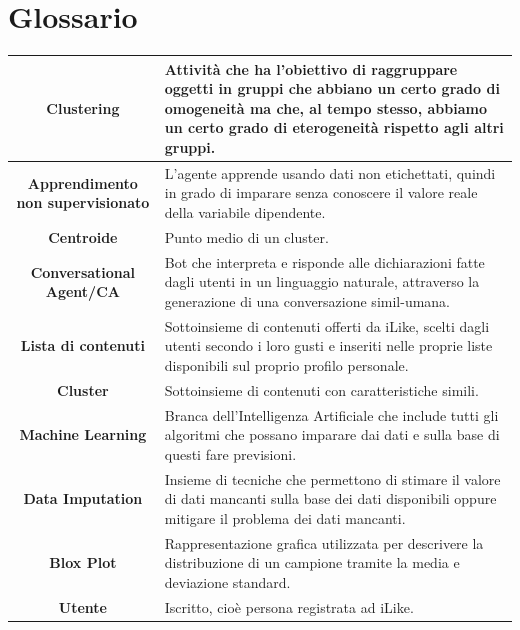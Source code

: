 \documentclass[a4paper, 10pt]{report}
\begin{document}
    \chapter{Glossario}\label{ch:glossario}
        \begin{adjustbox}{width=\columnwidth,center}
            \begin{tabular}{|>{\columncolor{Goldenrod}}c|p{8cm}|}
                \hline \textbf{Clustering} & Attività che ha l’obiettivo di raggruppare oggetti in gruppi che abbiano un certo grado
                        di omogeneità ma che, al tempo stesso, abbiamo un certo grado di eterogeneità rispetto agli altri gruppi.\\
                \hline \textbf{Apprendimento non supervisionato} & L'agente apprende usando dati non etichettati, quindi in grado di
                        imparare senza conoscere il valore reale della variabile dipendente.\\
                \hline \textbf{Centroide} & Punto medio di un cluster.\\
                \hline \textbf{Conversational Agent/CA} & Bot che interpreta e risponde alle dichiarazioni fatte dagli utenti
                        in un linguaggio naturale, attraverso la  generazione di una conversazione simil-umana.\\
                \hline \textbf{Lista di contenuti} & Sottoinsieme di contenuti offerti da iLike, scelti dagli utenti secondo i loro gusti
                        e inseriti nelle proprie liste disponibili sul proprio profilo personale.\\
                \hline \textbf{Cluster} & Sottoinsieme di contenuti con caratteristiche simili.\\
                \hline \textbf{Machine Learning} & Branca dell'Intelligenza Artificiale che include tutti gli algoritmi
                        che possano imparare dai dati e sulla base di questi fare previsioni.\\
                \hline \textbf{Data Imputation} & Insieme di tecniche che permettono di stimare il valore di dati mancanti
                        sulla base dei dati disponibili oppure mitigare il problema dei dati mancanti.\\
                \hline \textbf{Blox Plot} & Rappresentazione grafica utilizzata per descrivere la distribuzione di un campione
                        tramite la media e deviazione standard.\\
                \hline \textbf{Utente} & Iscritto, cioè persona registrata ad iLike.\\

\end{tabular}
\end{adjustbox}
\end{document}
